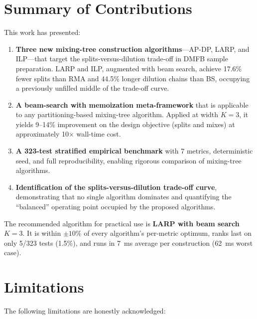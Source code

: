 
\section{Summary of Contributions}

This work has presented:

\begin{enumerate}
    \item \textbf{Three new mixing-tree construction algorithms}---AP-DP, LARP, and ILP---that target the splits-versus-dilution trade-off in DMFB sample preparation. LARP and ILP, augmented with beam search, achieve 17.6\% fewer splits than RMA and 44.5\% longer dilution chains than BS, occupying a previously unfilled middle of the trade-off curve.
    
    \item \textbf{A beam-search with memoization meta-framework} that is applicable to any partitioning-based mixing-tree algorithm. Applied at width $K = 3$, it yields 9--14\% improvement on the design objective (splits and mixes) at approximately 10$\times$ wall-time cost.
    
    \item \textbf{A 323-test stratified empirical benchmark} with 7 metrics, deterministic seed, and full reproducibility, enabling rigorous comparison of mixing-tree algorithms.
    
    \item \textbf{Identification of the splits-versus-dilution trade-off curve}, demonstrating that no single algorithm dominates and quantifying the ``balanced'' operating point occupied by the proposed algorithms.
\end{enumerate}

The recommended algorithm for practical use is \textbf{LARP with beam search $K = 3$}. It is within $\pm 10\%$ of every algorithm's per-metric optimum, ranks last on only 5/323 tests (1.5\%), and runs in 7~ms average per construction (62~ms worst case).

\section{Limitations}
\label{sec:limitations}

The following limitations are honestly acknowledged:

